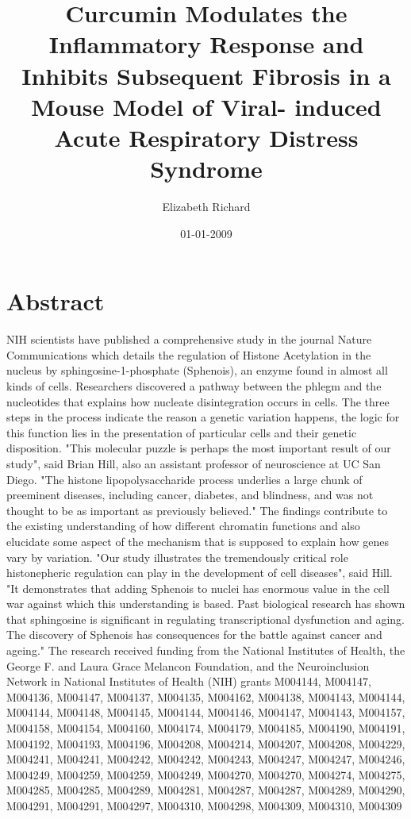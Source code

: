 \documentclass{article}%
\title{Curcumin Modulates the Inflammatory Response and Inhibits Subsequent Fibrosis in a Mouse Model of Viral{-} induced Acute Respiratory Distress Syndrome}%
\author{Elizabeth Richard}%
\affil{Instituto de Biologa Molecular y Celular de Plantas, Universidad Politcnica de Valencia{-}C.S.I.C, Ciudad Politcnica de la Innovacin, Valencia, Spain}%
\date{01{-}01{-}2009}%
\begin{document}
%
\normalsize%
\maketitle%
\section{Abstract}%
\label{sec:Abstract}%
NIH scientists have published a comprehensive study in the journal Nature Communications which details the regulation of Histone Acetylation in the nucleus by sphingosine{-}1{-}phosphate (Sphenois), an enzyme found in almost all kinds of cells.\newline%
Researchers discovered a pathway between the phlegm and the nucleotides that explains how nucleate disintegration occurs in cells. The three steps in the process indicate the reason a genetic variation happens, the logic for this function lies in the presentation of particular cells and their genetic disposition.\newline%
"This molecular puzzle is perhaps the most important result of our study", said Brian Hill, also an assistant professor of neuroscience at UC San Diego. "The histone lipopolysaccharide process underlies a large chunk of preeminent diseases, including cancer, diabetes, and blindness, and was not thought to be as important as previously believed."\newline%
The findings contribute to the existing understanding of how different chromatin functions and also elucidate some aspect of the mechanism that is supposed to explain how genes vary by variation.\newline%
"Our study illustrates the tremendously critical role histonepheric regulation can play in the development of cell diseases", said Hill. "It demonstrates that adding Sphenois to nuclei has enormous value in the cell war against which this understanding is based. Past biological research has shown that sphingosine is significant in regulating transcriptional dysfunction and aging. The discovery of Sphenois has consequences for the battle against cancer and ageing."\newline%
The research received funding from the National Institutes of Health, the George F. and Laura Grace Melancon Foundation, and the Neuroinclusion Network in National Institutes of Health (NIH) grants M004144, M004147, M004136, M004147, M004137, M004135, M004162, M004138, M004143, M004144, M004144, M004148, M004145, M004144, M004146, M004147, M004143, M004157, M004158, M004154, M004160, M004174, M004179, M004185, M004190, M004191, M004192, M004193, M004196, M004208, M004214, M004207, M004208, M004229, M004241, M004241, M004242, M004242, M004243, M004247, M004247, M004246, M004249, M004259, M004259, M004249, M004270, M004270, M004274, M004275, M004285, M004285, M004289, M004281, M004287, M004287, M004289, M004290, M004291, M004291, M004297, M004310, M004298, M004309, M004310, M004309
\end{document}
